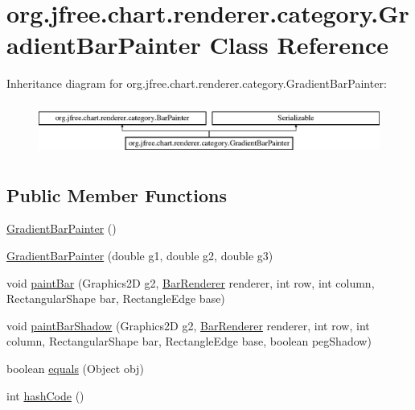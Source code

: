 \hypertarget{classorg_1_1jfree_1_1chart_1_1renderer_1_1category_1_1_gradient_bar_painter}{}\section{org.\+jfree.\+chart.\+renderer.\+category.\+Gradient\+Bar\+Painter Class Reference}
\label{classorg_1_1jfree_1_1chart_1_1renderer_1_1category_1_1_gradient_bar_painter}
Inheritance diagram for org.\+jfree.\+chart.\+renderer.\+category.\+Gradient\+Bar\+Painter\+:\begin{figure}[H]
\begin{center}
\leavevmode
\includegraphics[height=1.739130cm]{classorg_1_1jfree_1_1chart_1_1renderer_1_1category_1_1_gradient_bar_painter}
\end{center}
\end{figure}
\subsection*{Public Member Functions}
\begin{DoxyCompactItemize}
\item 
\mbox{\hyperlink{classorg_1_1jfree_1_1chart_1_1renderer_1_1category_1_1_gradient_bar_painter_af6e9c32b3bc115b9e5d4726cc1254dbb}{Gradient\+Bar\+Painter}} ()
\item 
\mbox{\hyperlink{classorg_1_1jfree_1_1chart_1_1renderer_1_1category_1_1_gradient_bar_painter_a2ffcfdc410a83a01d2a8a0bbd6d221d8}{Gradient\+Bar\+Painter}} (double g1, double g2, double g3)
\item 
void \mbox{\hyperlink{classorg_1_1jfree_1_1chart_1_1renderer_1_1category_1_1_gradient_bar_painter_ac89360601b497bee3e7380f57b495e0a}{paint\+Bar}} (Graphics2D g2, \mbox{\hyperlink{classorg_1_1jfree_1_1chart_1_1renderer_1_1category_1_1_bar_renderer}{Bar\+Renderer}} renderer, int row, int column, Rectangular\+Shape bar, Rectangle\+Edge base)
\item 
void \mbox{\hyperlink{classorg_1_1jfree_1_1chart_1_1renderer_1_1category_1_1_gradient_bar_painter_a6fdd82aba724f29c372b091c6ab42a07}{paint\+Bar\+Shadow}} (Graphics2D g2, \mbox{\hyperlink{classorg_1_1jfree_1_1chart_1_1renderer_1_1category_1_1_bar_renderer}{Bar\+Renderer}} renderer, int row, int column, Rectangular\+Shape bar, Rectangle\+Edge base, boolean peg\+Shadow)
\item 
boolean \mbox{\hyperlink{classorg_1_1jfree_1_1chart_1_1renderer_1_1category_1_1_gradient_bar_painter_ab57cd0c00c4b649ff6bfb3f6b06c757c}{equals}} (Object obj)
\item 
int \mbox{\hyperlink{classorg_1_1jfree_1_1chart_1_1renderer_1_1category_1_1_gradient_bar_painter_a171dcfafe826b939e57e773b3cbefeb4}{hash\+Code}} ()
\end{DoxyCompactItemize}


